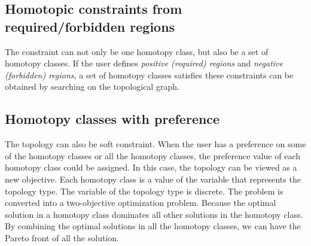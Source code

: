 \documentclass[letterpaper, 10 pt, conference]{ieeeconf}
\begin{document}
\subsection{Homotopic constraints from required/forbidden regions}

The constraint can not only be one homotopy class, but also be a set of homotopy classes.
If the user defines \emph{positive (required) regions} and \emph{negative (forbidden) regions}, 
a set of homotopy classes satisfies these constraints can be obtained by searching on the topological graph.

\subsection{Homotopy classes with preference}

The topology can also be soft constraint.
When the user has a preference on some of the homotopy classes or all the homotopy classes,
the preference value of each homotopy class could be assigned.
In this case, the topology can be viewed as a new objective.
Each homotopy class is a value of the variable that represents the topology type.
The variable of the topology type is discrete.
The problem is converted into a two-objective optimization problem.
Because the optimal solution in a homotopy class dominates all other solutions in the homotopy class.
By combining the optimal solutions in all the homotopy classes, we can have the Pareto front of all the solution.
\end{document}
